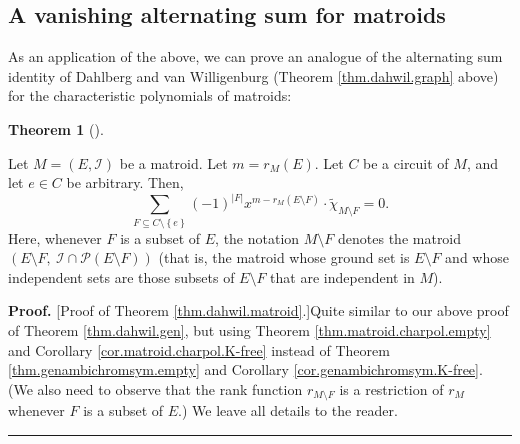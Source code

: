 \documentclass[numbers=enddot,12pt,final,onecolumn,notitlepage]{scrartcl}%
\theoremstyle{definition}
\newtheorem{theo}{Theorem}[section]
\newenvironment{theorem}[1][]
{\begin{theo}[#1]\begin{leftbar}}
{\end{leftbar}\end{theo}}
\newenvironment{proof}[1][Proof]{\noindent\textbf{#1.} }{\ \rule{0.5em}{0.5em}}
\newenvironment{vershort}{}{}
\let\sumnonlimits\sum
\renewcommand{\sum}{\sumnonlimits\limits}
\begin{document}
\subsection{\label{subsec.matroid.alt-sum}A vanishing alternating sum for
matroids}

As an application of the above, we can prove an analogue of the alternating
sum identity of Dahlberg and van Willigenburg (Theorem \ref{thm.dahwil.graph}
above) for the characteristic polynomials of matroids:

\begin{theorem}
\label{thm.dahwil.matroid}Let $M=\left(  E,\mathcal{I}\right)  $ be a matroid.
Let $m=r_{M}\left(  E\right)  $. Let $C$ be a circuit of $M$, and let $e\in C$
be arbitrary. Then,%
\[
\sum_{F\subseteq C\setminus\left\{  e\right\}  }\left(  -1\right)
^{\left\vert F\right\vert }x^{m-r_{M}\left(  E\setminus F\right)  }%
\cdot\widetilde{\chi}_{M\setminus F}=0.
\]
Here, whenever $F$ is a subset of $E$, the notation $M\setminus F$ denotes the
matroid $\left(  E\setminus F,\ \mathcal{I}\cap\mathcal{P}\left(  E\setminus
F\right)  \right)  $ (that is, the matroid whose ground set is $E\setminus F$
and whose independent sets are those subsets of $E\setminus F$ that are
independent in $M$).
\end{theorem}

\begin{vershort}
\begin{proof}
[Proof of Theorem \ref{thm.dahwil.matroid}.]Quite similar to our above proof
of Theorem \ref{thm.dahwil.gen}, but using Theorem
\ref{thm.matroid.charpol.empty} and Corollary \ref{cor.matroid.charpol.K-free}
instead of Theorem \ref{thm.genambichromsym.empty} and Corollary
\ref{cor.genambichromsym.K-free}. (We also need to observe that the rank
function $r_{M\setminus F}$ is a restriction of $r_{M}$ whenever $F$ is a
subset of $E$.) We leave all details to the reader.
\end{proof}
\end{vershort}
\end{document}
